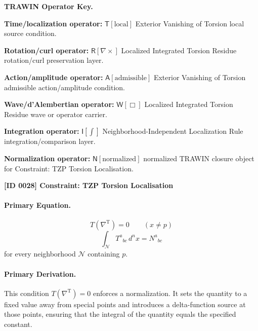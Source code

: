 \par\vspace{0.45\baselineskip}
\noindent\begin{minipage}[t]{\linewidth}
\begingroup
\small
\raggedright
\textbf{TRAWIN Operator Key.}\par
\noindent\textbf{Time/localization operator:} $\mathsf{T}\!\left[\mathrm{local}\right]$ Exterior Vanishing of Torsion local source condition.\par
\noindent\textbf{Rotation/curl operator:} $\mathsf{R}\!\left[\nabla\times\right]$ Localized Integrated Torsion Residue rotation/curl preservation layer.\par
\noindent\textbf{Action/amplitude operator:} $\mathsf{A}\!\left[\mathrm{admissible}\right]$ Exterior Vanishing of Torsion admissible action/amplitude condition.\par
\noindent\textbf{Wave/d'Alembertian operator:} $\mathsf{W}\!\left[\Box\right]$ Localized Integrated Torsion Residue wave or operator carrier.\par
\noindent\textbf{Integration operator:} $\mathsf{I}\!\left[\int\right]$ Neighborhood-Independent Localization Rule integration/comparison layer.\par
\noindent\textbf{Normalization operator:} $\mathsf{N}\!\left[\mathrm{normalized}\right]$ normalized TRAWIN closure object for Constraint: TZP Torsion Localisation.\par
\endgroup
\end{minipage}

\clearpage
\noindent\textbf{[ID 0028] Constraint: TZP Torsion Localisation}\par
\vspace{0.35em}
\paragraph{Primary Equation.}
\[
T(\nabla^{\mathrm{T}})=0
\qquad (x\neq p)
\]
\[
\int_{\mathcal N}
T^{a}{}_{bc}\,d^{n}x
=
N^{a}{}_{bc}
\]
for every neighborhood \(\mathcal N\) containing \(p\).

\paragraph{Primary Derivation.}
This condition \( T(\nabla^{\mathrm{T}})=0 \) enforces a normalization. It sets the quantity to a fixed value away from special points and introduces a delta-function source at those points, ensuring that the integral of the quantity equals the specified constant.
